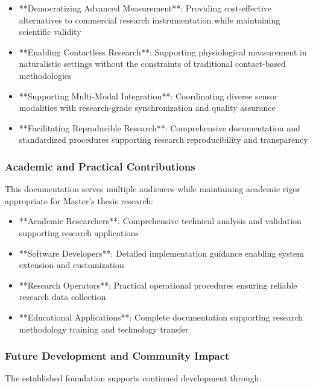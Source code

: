 \documentclass[12pt,a4paper]{article}
\begin{document}
\begin{itemize}
\item **Democratizing Advanced Measurement**: Providing cost-effective alternatives to commercial research instrumentation
  while maintaining scientific validity
\item **Enabling Contactless Research**: Supporting physiological measurement in naturalistic settings without the
  constraints of traditional contact-based methodologies
\item **Supporting Multi-Modal Integration**: Coordinating diverse sensor modalities with research-grade synchronization and
  quality assurance
\item **Facilitating Reproducible Research**: Comprehensive documentation and standardized procedures supporting research
  reproducibility and transparency

\end{itemize}
\subsubsection{Academic and Practical Contributions}

This documentation serves multiple audiences while maintaining academic rigor appropriate for Master's thesis research:

\begin{itemize}
\item **Academic Researchers**: Comprehensive technical analysis and validation supporting research applications
\item **Software Developers**: Detailed implementation guidance enabling system extension and customization
\item **Research Operators**: Practical operational procedures ensuring reliable research data collection
\item **Educational Applications**: Complete documentation supporting research methodology training and technology transfer

\end{itemize}
\subsubsection{Future Development and Community Impact}

The established foundation supports continued development through:
\end{document}
